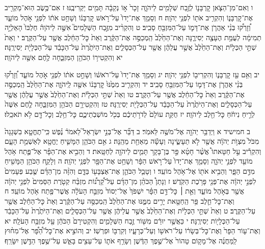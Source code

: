 \documentclass[twoside, openany, parskip=half, 11pt]{book}
\begin{document}
ו וְאִם־מִן־הַצֹּ֧אן קׇרְבָּנ֛וֹ לְזֶ֥בַח שְׁלָמִ֖ים לַיהֹוָ֑ה זָכָר֙ א֣וֹ נְקֵבָ֔ה תָּמִ֖ים יַקְרִיבֶֽנּוּ׃ ז אִם־כֶּ֥שֶׂב הֽוּא־מַקְרִ֖יב אֶת־קׇרְבָּנ֑וֹ וְהִקְרִ֥יב אֹת֖וֹ לִפְנֵ֥י יְהֹוָֽה׃ ח וְסָמַ֤ךְ אֶת־יָדוֹ֙ עַל־רֹ֣אשׁ קׇרְבָּנ֔וֹ וְשָׁחַ֣ט אֹת֔וֹ לִפְנֵ֖י אֹ֣הֶל מוֹעֵ֑ד וְ֠זָרְק֠וּ בְּנֵ֨י אַהֲרֹ֧ן אֶת־דָּמ֛וֹ עַל־הַמִּזְבֵּ֖חַ סָבִֽיב׃ ט וְהִקְרִ֨יב מִזֶּ֣בַח הַשְּׁלָמִים֮ אִשֶּׁ֣ה לַיהֹוָה֒ חֶלְבּוֹ֙ הָאַלְיָ֣ה תְמִימָ֔ה לְעֻמַּ֥ת הֶעָצֶ֖ה יְסִירֶ֑נָּה וְאֶת־הַחֵ֙לֶב֙ הַֽמְכַסֶּ֣ה אֶת־הַקֶּ֔רֶב וְאֵת֙ כׇּל־הַחֵ֔לֶב אֲשֶׁ֖ר עַל־הַקֶּֽרֶב׃ י וְאֵת֙ שְׁתֵּ֣י הַכְּלָיֹ֔ת וְאֶת־הַחֵ֙לֶב֙ אֲשֶׁ֣ר עֲלֵהֶ֔ן אֲשֶׁ֖ר עַל־הַכְּסָלִ֑ים וְאֶת־הַיֹּתֶ֙רֶת֙ עַל־הַכָּבֵ֔ד עַל־הַכְּלָיֹ֖ת יְסִירֶֽנָּה׃ יא וְהִקְטִיר֥וֹ הַכֹּהֵ֖ן הַמִּזְבֵּ֑חָה לֶ֥חֶם אִשֶּׁ֖ה לַיהֹוָֽה׃

יב וְאִ֥ם עֵ֖ז קׇרְבָּנ֑וֹ וְהִקְרִיב֖וֹ לִפְנֵ֥י יְהֹוָֽה׃ יג וְסָמַ֤ךְ אֶת־יָדוֹ֙ עַל־רֹאשׁ֔וֹ וְשָׁחַ֣ט אֹת֔וֹ לִפְנֵ֖י אֹ֣הֶל מוֹעֵ֑ד וְ֠זָרְק֠וּ בְּנֵ֨י אַהֲרֹ֧ן אֶת־דָּמ֛וֹ עַל־הַמִּזְבֵּ֖חַ סָבִֽיב׃ יד וְהִקְרִ֤יב מִמֶּ֙נּוּ֙ קׇרְבָּנ֔וֹ אִשֶּׁ֖ה לַֽיהֹוָ֑ה אֶת־הַחֵ֙לֶב֙ הַֽמְכַסֶּ֣ה אֶת־הַקֶּ֔רֶב וְאֵת֙ כׇּל־הַחֵ֔לֶב אֲשֶׁ֖ר עַל־הַקֶּֽרֶב׃ טו וְאֵת֙ שְׁתֵּ֣י הַכְּלָיֹ֔ת וְאֶת־הַחֵ֙לֶב֙ אֲשֶׁ֣ר עֲלֵהֶ֔ן אֲשֶׁ֖ר עַל־הַכְּסָלִ֑ים וְאֶת־הַיֹּתֶ֙רֶת֙ עַל־הַכָּבֵ֔ד עַל־הַכְּלָיֹ֖ת יְסִירֶֽנָּה׃ טז וְהִקְטִירָ֥ם הַכֹּהֵ֖ן הַמִּזְבֵּ֑חָה לֶ֤חֶם אִשֶּׁה֙ לְרֵ֣יחַ נִיחֹ֔חַ כׇּל־חֵ֖לֶב לַיהֹוָֽה׃ יז חֻקַּ֤ת עוֹלָם֙ לְדֹרֹ֣תֵיכֶ֔ם בְּכֹ֖ל מוֹשְׁבֹֽתֵיכֶ֑ם כׇּל־חֵ֥לֶב וְכׇל־דָּ֖ם לֹ֥א תֹאכֵֽלוּ׃

ב חמישיד א וַיְדַבֵּ֥ר יְהֹוָ֖ה אֶל־מֹשֶׁ֥ה לֵּאמֹֽר׃ ב דַּבֵּ֞ר אֶל־בְּנֵ֣י יִשְׂרָאֵל֮ לֵאמֹר֒ נֶ֗פֶשׁ כִּֽי־תֶחֱטָ֤א בִשְׁגָגָה֙ מִכֹּל֙ מִצְוֺ֣ת יְהֹוָ֔ה אֲשֶׁ֖ר לֹ֣א תֵעָשֶׂ֑ינָה וְעָשָׂ֕ה מֵאַחַ֖ת מֵהֵֽנָּה׃ ג אִ֣ם הַכֹּהֵ֧ן הַמָּשִׁ֛יחַ יֶחֱטָ֖א לְאַשְׁמַ֣ת הָעָ֑ם וְהִקְרִ֡יב עַ֣ל חַטָּאתוֹ֩ אֲשֶׁ֨ר חָטָ֜א פַּ֣ר בֶּן־בָּקָ֥ר תָּמִ֛ים לַיהֹוָ֖ה לְחַטָּֽאת׃ ד וְהֵבִ֣יא אֶת־הַפָּ֗ר אֶל־פֶּ֛תַח אֹ֥הֶל מוֹעֵ֖ד לִפְנֵ֣י יְהֹוָ֑ה וְסָמַ֤ךְ אֶת־יָדוֹ֙ עַל־רֹ֣אשׁ הַפָּ֔ר וְשָׁחַ֥ט אֶת־הַפָּ֖ר לִפְנֵ֥י יְהֹוָֽה׃ ה וְלָקַ֛ח הַכֹּהֵ֥ן הַמָּשִׁ֖יחַ מִדַּ֣ם הַפָּ֑ר וְהֵבִ֥יא אֹת֖וֹ אֶל־אֹ֥הֶל מוֹעֵֽד׃ ו וְטָבַ֧ל הַכֹּהֵ֛ן אֶת־אֶצְבָּע֖וֹ בַּדָּ֑ם וְהִזָּ֨ה מִן־הַדָּ֜ם שֶׁ֤בַע פְּעָמִים֙ לִפְנֵ֣י יְהֹוָ֔ה אֶת־פְּנֵ֖י פָּרֹ֥כֶת הַקֹּֽדֶשׁ׃ ז וְנָתַן֩ הַכֹּהֵ֨ן מִן־הַדָּ֜ם עַל־קַ֠רְנ֠וֹת מִזְבַּ֨ח קְטֹ֤רֶת הַסַּמִּים֙ לִפְנֵ֣י יְהֹוָ֔ה אֲשֶׁ֖ר בְּאֹ֣הֶל מוֹעֵ֑ד וְאֵ֣ת ׀ כׇּל־דַּ֣ם הַפָּ֗ר יִשְׁפֹּךְ֙ אֶל־יְסוֹד֙ מִזְבַּ֣ח הָעֹלָ֔ה אֲשֶׁר־פֶּ֖תַח אֹ֥הֶל מוֹעֵֽד׃ ח וְאֶת־כׇּל־חֵ֛לֶב פַּ֥ר הַֽחַטָּ֖את יָרִ֣ים מִמֶּ֑נּוּ אֶת־הַחֵ֙לֶב֙ הַֽמְכַסֶּ֣ה עַל־הַקֶּ֔רֶב וְאֵת֙ כׇּל־הַחֵ֔לֶב אֲשֶׁ֖ר עַל־הַקֶּֽרֶב׃ ט וְאֵת֙ שְׁתֵּ֣י הַכְּלָיֹ֔ת וְאֶת־הַחֵ֙לֶב֙ אֲשֶׁ֣ר עֲלֵיהֶ֔ן אֲשֶׁ֖ר עַל־הַכְּסָלִ֑ים וְאֶת־הַיֹּתֶ֙רֶת֙ עַל־הַכָּבֵ֔ד עַל־הַכְּלָי֖וֹת יְסִירֶֽנָּה׃ י כַּאֲשֶׁ֣ר יוּרַ֔ם מִשּׁ֖וֹר זֶ֣בַח הַשְּׁלָמִ֑ים וְהִקְטִירָם֙ הַכֹּהֵ֔ן עַ֖ל מִזְבַּ֥ח הָעֹלָֽה׃ יא וְאֶת־ע֤וֹר הַפָּר֙ וְאֶת־כׇּל־בְּשָׂר֔וֹ עַל־רֹאשׁ֖וֹ וְעַל־כְּרָעָ֑יו וְקִרְבּ֖וֹ וּפִרְשֽׁוֹ׃ יב וְהוֹצִ֣יא אֶת־כׇּל־הַ֠פָּ֠ר אֶל־מִח֨וּץ לַֽמַּחֲנֶ֜ה אֶל־מָק֤וֹם טָהוֹר֙ אֶל־שֶׁ֣פֶךְ הַדֶּ֔שֶׁן וְשָׂרַ֥ף אֹת֛וֹ עַל־עֵצִ֖ים בָּאֵ֑שׁ עַל־שֶׁ֥פֶךְ הַדֶּ֖שֶׁן יִשָּׂרֵֽף׃
\end{document}
